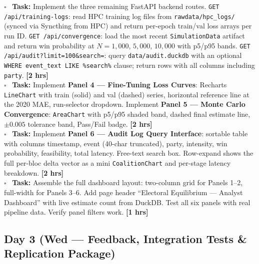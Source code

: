 \documentclass[11pt]{article}
\newcommand{\hrs}[1]{\textbf{[#1 hrs]}}
\newcommand{\dayhead}[2]{%
  \subsection*{Day #1 \normalfont\small\color{codegray}(#2)}}
\newcommand{\task}[2]{%
  \noindent\textbf{Task:} #1 \hfill \hrs{#2}\\}
\newcommand{\done}{\textcolor{sectionblue}{$\square$}\ }
\begin{document}
\begin{taskbox}
\done \task{Implement the three remaining FastAPI backend routes.
  \texttt{GET /api/training-logs}: read HPC training log files from
  \texttt{rawdata/hpc\_logs/} (synced via Syncthing from HPC) and return
  per-epoch train/val loss arrays per run ID. \texttt{GET /api/convergence}:
  load the most recent \texttt{SimulationData} artifact and return win
  probability at $N = 1{,}000$, $5{,}000$, $10{,}000$ with p5/p95 bands.
  \texttt{GET /api/audit?limit=100\&search=}: query
  \texttt{data/audit.duckdb} with an optional \texttt{WHERE event\_text
  LIKE \%search\%} clause; return rows with all columns including
  \texttt{party}.}{2}

\done \task{Implement \textbf{Panel 4 --- Fine-Tuning Loss Curves}:
  Recharts \texttt{LineChart} with train (solid) and val (dashed) series,
  horizontal reference line at the 2020 MAE, run-selector dropdown.
  Implement \textbf{Panel 5 --- Monte Carlo Convergence}: \texttt{AreaChart}
  with p5/p95 shaded band, dashed final estimate line, $\pm 0.005$
  tolerance band, Pass/Fail badge.}{2}

\done \task{Implement \textbf{Panel 6 --- Audit Log Query Interface}:
  sortable table with columns timestamp, event (40-char truncated),
  party, intensity, win probability, feasibility, total latency. Free-text
  search box. Row-expand shows the full per-bloc delta vector as a mini
  \texttt{CoalitionChart} and per-stage latency breakdown.}{2}

\done \task{Assemble the full dashboard layout: two-column grid for Panels
  1--2, full-width for Panels 3--6. Add page header ``Electoral Equilibrium
  --- Analyst Dashboard'' with live estimate count from DuckDB. Test all
  six panels with real pipeline data. Verify panel filters work.}{1}
\end{taskbox}

\dayhead{3}{Wed --- Feedback, Integration Tests \& Replication Package}
\end{document}
